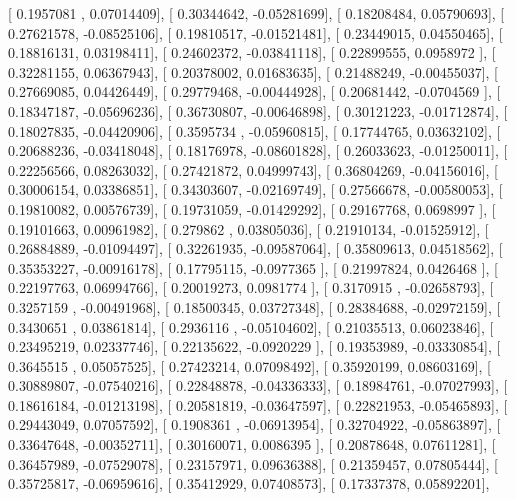 \documentclass{article}
\begin{document}
       [ 0.1957081 ,  0.07014409],
       [ 0.30344642, -0.05281699],
       [ 0.18208484,  0.05790693],
       [ 0.27621578, -0.08525106],
       [ 0.19810517, -0.01521481],
       [ 0.23449015,  0.04550465],
       [ 0.18816131,  0.03198411],
       [ 0.24602372, -0.03841118],
       [ 0.22899555,  0.0958972 ],
       [ 0.32281155,  0.06367943],
       [ 0.20378002,  0.01683635],
       [ 0.21488249, -0.00455037],
       [ 0.27669085,  0.04426449],
       [ 0.29779468, -0.00444928],
       [ 0.20681442, -0.0704569 ],
       [ 0.18347187, -0.05696236],
       [ 0.36730807, -0.00646898],
       [ 0.30121223, -0.01712874],
       [ 0.18027835, -0.04420906],
       [ 0.3595734 , -0.05960815],
       [ 0.17744765,  0.03632102],
       [ 0.20688236, -0.03418048],
       [ 0.18176978, -0.08601828],
       [ 0.26033623, -0.01250011],
       [ 0.22256566,  0.08263032],
       [ 0.27421872,  0.04999743],
       [ 0.36804269, -0.04156016],
       [ 0.30006154,  0.03386851],
       [ 0.34303607, -0.02169749],
       [ 0.27566678, -0.00580053],
       [ 0.19810082,  0.00576739],
       [ 0.19731059, -0.01429292],
       [ 0.29167768,  0.0698997 ],
       [ 0.19101663,  0.00961982],
       [ 0.279862  ,  0.03805036],
       [ 0.21910134, -0.01525912],
       [ 0.26884889, -0.01094497],
       [ 0.32261935, -0.09587064],
       [ 0.35809613,  0.04518562],
       [ 0.35353227, -0.00916178],
       [ 0.17795115, -0.0977365 ],
       [ 0.21997824,  0.0426468 ],
       [ 0.22197763,  0.06994766],
       [ 0.20019273,  0.0981774 ],
       [ 0.3170915 , -0.02658793],
       [ 0.3257159 , -0.00491968],
       [ 0.18500345,  0.03727348],
       [ 0.28384688, -0.02972159],
       [ 0.3430651 ,  0.03861814],
       [ 0.2936116 , -0.05104602],
       [ 0.21035513,  0.06023846],
       [ 0.23495219,  0.02337746],
       [ 0.22135622, -0.0920229 ],
       [ 0.19353989, -0.03330854],
       [ 0.3645515 ,  0.05057525],
       [ 0.27423214,  0.07098492],
       [ 0.35920199,  0.08603169],
       [ 0.30889807, -0.07540216],
       [ 0.22848878, -0.04336333],
       [ 0.18984761, -0.07027993],
       [ 0.18616184, -0.01213198],
       [ 0.20581819, -0.03647597],
       [ 0.22821953, -0.05465893],
       [ 0.29443049,  0.07057592],
       [ 0.1908361 , -0.06913954],
       [ 0.32704922, -0.05863897],
       [ 0.33647648, -0.00352711],
       [ 0.30160071,  0.0086395 ],
       [ 0.20878648,  0.07611281],
       [ 0.36457989, -0.07529078],
       [ 0.23157971,  0.09636388],
       [ 0.21359457,  0.07805444],
       [ 0.35725817, -0.06959616],
       [ 0.35412929,  0.07408573],
       [ 0.17337378,  0.05892201],
\end{document}
